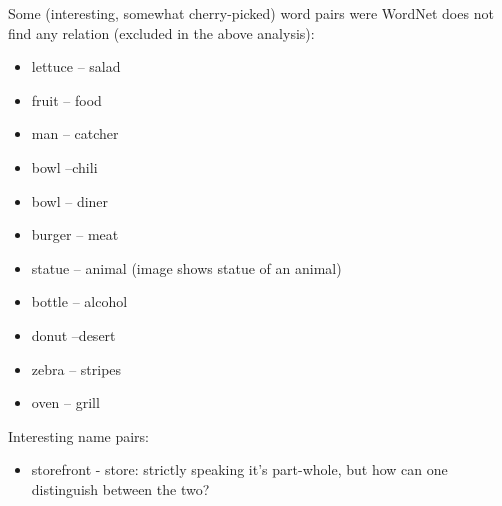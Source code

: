 Some (interesting, somewhat cherry-picked) word pairs were WordNet does not find any relation (excluded in the above analysis):

\begin{itemize}
\item lettuce -- salad
\item fruit -- food
\item man -- catcher
\item bowl --chili
\item bowl -- diner  
\item burger -- meat
\item statue -- animal (image shows statue of an animal)
\item bottle -- alcohol
\item donut --desert  
\item zebra -- stripes
\item oven -- grill
\end{itemize}


Interesting name pairs:

\begin{itemize}
\item storefront - store: strictly speaking it's part-whole, but how can one distinguish between the two? 
\end{itemize}





